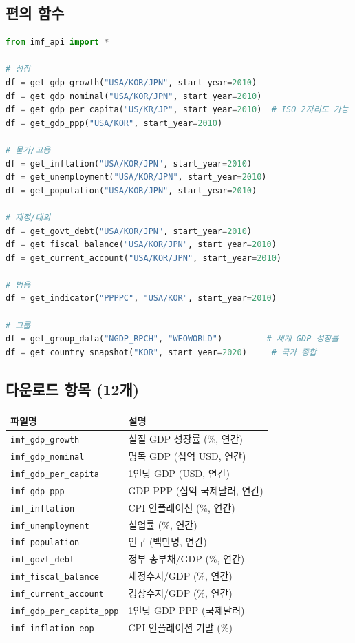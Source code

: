 \documentclass[11pt,a4paper]{article}
\newcommand{\file}[1]{\texttt{\textcolor{string}{#1}}}
\begin{document}
\subsection{편의 함수}

\begin{lstlisting}[language=Python]
from imf_api import *

# 성장
df = get_gdp_growth("USA/KOR/JPN", start_year=2010)
df = get_gdp_nominal("USA/KOR/JPN", start_year=2010)
df = get_gdp_per_capita("US/KR/JP", start_year=2010)  # ISO 2자리도 가능
df = get_gdp_ppp("USA/KOR", start_year=2010)

# 물가/고용
df = get_inflation("USA/KOR/JPN", start_year=2010)
df = get_unemployment("USA/KOR/JPN", start_year=2010)
df = get_population("USA/KOR/JPN", start_year=2010)

# 재정/대외
df = get_govt_debt("USA/KOR/JPN", start_year=2010)
df = get_fiscal_balance("USA/KOR/JPN", start_year=2010)
df = get_current_account("USA/KOR/JPN", start_year=2010)

# 범용
df = get_indicator("PPPPC", "USA/KOR", start_year=2010)

# 그룹
df = get_group_data("NGDP_RPCH", "WEOWORLD")         # 세계 GDP 성장률
df = get_country_snapshot("KOR", start_year=2020)     # 국가 종합
\end{lstlisting}

\subsection{다운로드 항목 (12개)}

\begin{longtable}{l l}
\toprule
\textbf{파일명} & \textbf{설명} \\
\midrule
\endhead
\file{imf\_gdp\_growth}           & 실질 GDP 성장률 (\%, 연간) \\
\file{imf\_gdp\_nominal}          & 명목 GDP (십억 USD, 연간) \\
\file{imf\_gdp\_per\_capita}      & 1인당 GDP (USD, 연간) \\
\file{imf\_gdp\_ppp}              & GDP PPP (십억 국제달러, 연간) \\
\file{imf\_inflation}             & CPI 인플레이션 (\%, 연간) \\
\file{imf\_unemployment}          & 실업률 (\%, 연간) \\
\file{imf\_population}            & 인구 (백만명, 연간) \\
\file{imf\_govt\_debt}            & 정부 총부채/GDP (\%, 연간) \\
\file{imf\_fiscal\_balance}       & 재정수지/GDP (\%, 연간) \\
\file{imf\_current\_account}      & 경상수지/GDP (\%, 연간) \\
\file{imf\_gdp\_per\_capita\_ppp} & 1인당 GDP PPP (국제달러) \\
\file{imf\_inflation\_eop}        & CPI 인플레이션 기말 (\%) \\
\bottomrule
\end{longtable}
\end{document}
